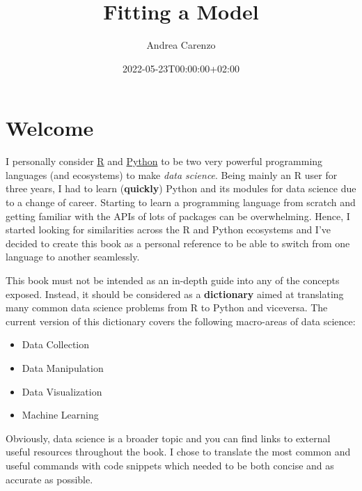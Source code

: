 \documentclass[
  letterpaper,
  DIV=11,
  numbers=noendperiod]{scrreprt}
\title{Fitting a Model}
\author{Andrea Carenzo}
\date{2022-05-23T00:00:00+02:00}
\providecommand{\tightlist}{%
  \setlength{\itemsep}{0pt}\setlength{\parskip}{0pt}}
\renewcommand*\contentsname{Table of contents}
\begin{document}
\maketitle

\ifdefined\Shaded\renewenvironment{Shaded}{\begin{tcolorbox}[boxrule=0pt, interior hidden, borderline west={3pt}{0pt}{shadecolor}, enhanced, sharp corners, frame hidden]}{\end{tcolorbox}}\fi

\renewcommand*\contentsname{Table of contents}
{
\hypersetup{linkcolor=}
\setcounter{tocdepth}{2}
\tableofcontents
}
\hypertarget{welcome}{%
\chapter*{Welcome}\label{welcome}}

I personally consider \href{https://www.r-project.org/}{R} and
\href{https://www.python.org/}{Python} to be two very powerful
programming languages (and ecosystems) to make \emph{data science}.
Being mainly an R user for three years, I had to learn
(\textbf{quickly}) Python and its modules for data science due to a
change of career. Starting to learn a programming language from scratch
and getting familiar with the APIs of lots of packages can be
overwhelming. Hence, I started looking for similarities across the R and
Python ecosystems and I've decided to create this book as a personal
reference to be able to switch from one language to another seamlessly.

This book must not be intended as an in-depth guide into any of the
concepts exposed. Instead, it should be considered as a
\textbf{dictionary} aimed at translating many common data science
problems from R to Python and viceversa. The current version of this
dictionary covers the following macro-areas of data science:

\begin{itemize}
\tightlist
\item
  Data Collection
\item
  Data Manipulation
\item
  Data Visualization
\item
  Machine Learning
\end{itemize}

Obviously, data science is a broader topic and you can find links to
external useful resources throughout the book. I chose to translate the
most common and useful commands with code snippets which needed to be
both concise and as accurate as possible.
\end{document}
